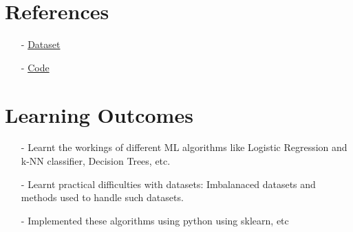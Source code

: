 \documentclass[letterpaper, 10 pt, conference]{ieeeconf}  %
\begin{document}




\section{References}
\begin{itemize}
    \item[-] \href{https://www.kaggle.com/datasets/joebeachcapital/credit-card-fraud/}{Dataset}
    \item[-] \href{github}{Code}
\end{itemize}


\section{Learning Outcomes}
\begin{itemize}
    \item[-] Learnt the workings of different ML algorithms like Logistic Regression and k-NN classifier, Decision Trees, etc.
    \item[-] Learnt practical difficulties with datasets: Imbalanaced datasets and methods used to handle such datasets.
    \item[-] Implemented these algorithms using python using sklearn, etc
\end{itemize}


% 
% 
\end{document}
